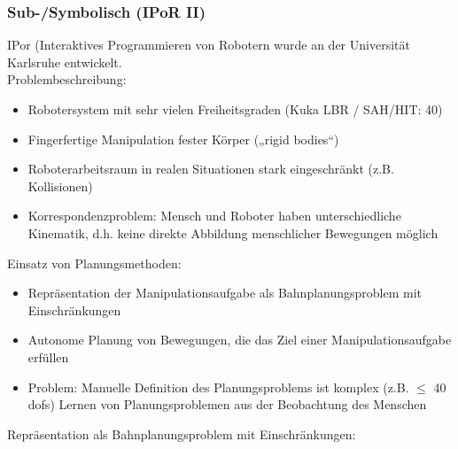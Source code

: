 \subsubsection*{Sub-/Symbolisch (IPoR II)}
IPor (Interaktives Programmieren von Robotern wurde an der Universität Karlsruhe entwickelt. \\
Problembeschreibung:
\begin{itemize}
\item Robotersystem mit sehr vielen Freiheitsgraden (Kuka LBR / SAH/HIT: 40)
\item  Fingerfertige Manipulation fester Körper („rigid bodies“)
\item Roboterarbeitsraum in realen Situationen stark eingeschränkt (z.B.
Kollisionen)
\item  \Gu Korrespondenzproblem\Go: Mensch und Roboter haben unterschiedliche
Kinematik, d.h. keine direkte Abbildung menschlicher Bewegungen möglich
\end{itemize}
Einsatz von Planungsmethoden:
\begin{itemize}
\item Repräsentation der Manipulationsaufgabe als Bahnplanungsproblem mit Einschränkungen
\item Autonome Planung von Bewegungen, die das Ziel einer Manipulationsaufgabe erfüllen
\item Problem: Manuelle Definition des Planungsproblems ist komplex (z.B. $\leq$ 40 dofs)
\ita Lernen von Planungsproblemen aus der Beobachtung des Menschen
\end{itemize}
Repräsentation als Bahnplanungsproblem mit Einschränkungen:
